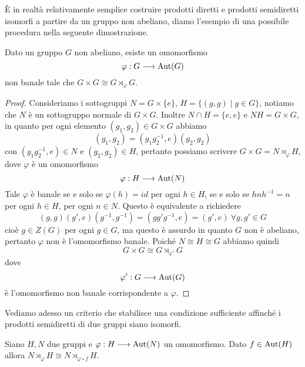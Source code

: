 \documentclass[11pt]{scrartcl}
\begin{document}
È in realtà relativamente semplice costruire prodotti diretti e prodotti semidiretti
isomorfi a partire da un gruppo non abeliano, diamo l'esempio di una possibile
procedura nella seguente dimostrazione.

\begin{proposition}
    Dato un gruppo $G$ non abeliano, esiste un omomorfismo
    \[
        \varphi: G\longrightarrow \operatorname{Aut}(G)
    \]
    non banale tale che $G\times G \cong G\rtimes_{\varphi} G$.
\end{proposition}

\begin{proof}
    Consideriamo i sottogruppi $N = G\times\{e\}$, $H = \{(g, g) \mid g \in G\}$,
    notiamo che $N$ è un sottogruppo normale di $G\times G$. Inoltre 
    $N\cap H = \{e, e\}$ e $NH = G\times G$, in quanto per 
    ogni elemento $(g_1, g_2) \in G\times G$ abbiamo
    \[
        (g_1, g_2) = (g_1g_2^{-1}, e)(g_2, g_2)
    \]
    con $(g_1g_2^{-1}, e) \in N$ e $(g_2, g_2) \in H$, pertanto possiamo 
    scrivere $G\times G = N \rtimes_{\varphi} H$, dove $\varphi$ è un omomorfismo
    \[
        \varphi: H \longrightarrow \operatorname{Aut}(N)
    \]
    Tale $\varphi$ è banale se e solo se $\varphi(h) = id$ per ogni $h \in H$,
    se e solo se $hnh^{-1} = n$ per ogni $h \in H$, per ogni $n \in N$.
    Questo è equivalente a richiedere 
    \[
        (g, g)(g', e)(g^{-1}, g^{-1}) = (gg'g^{-1}, e)= (g', e)~\forall g, g' \in G
    \]
    cioè $g \in Z(G)$ per ogni $g \in G$,
    ma questo è assurdo in quanto $G$ non è abeliano, pertanto $\varphi$
    non è l'omomorfismo banale. Poiché $N \cong H \cong G$ abbiamo quindi
    \[
        G \times G \cong G\rtimes_{\varphi'}G
    \]
    dove
    \[
        \varphi':G \longrightarrow \operatorname{Aut}(G)
    \]
    è l'omomorfismo non banale corrispondente a $\varphi$.
\end{proof}

Vediamo adesso un criterio che stabilisce una condizione sufficiente affinché 
i prodotti semidiretti di due gruppi siano isomorfi.

\begin{proposition}
    \label{prop1.74}
    Siano $H, N$ due gruppi e $\varphi: H \longrightarrow \operatorname{Aut}(N)$ un omomorfismo.
    Dato $f \in \operatorname{Aut}(H)$ allora $N\rtimes_{\varphi} H \cong N\rtimes_{\varphi\circ f} H$.
\end{proposition}
\end{document}

